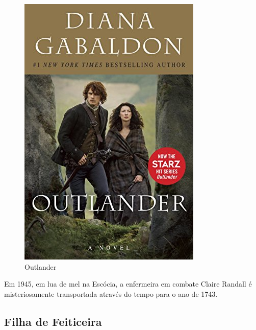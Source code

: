 \begin{figure}[htb]
	\caption{\label{Outlander}Outlander}
	\begin{center}
	    \includegraphics[width=\textwidth/2]{imagens/outlander.jpg}
	\end{center}
\end{figure}
Em 1945, em lua de mel na Escócia, a enfermeira em combate Claire Randall é misteriosamente transportada através do tempo para o ano de 1743.


\subsection{Filha de Feiticeira}

